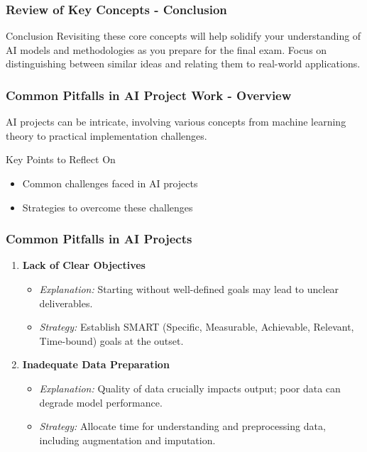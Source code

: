 \documentclass[aspectratio=169]{beamer}
\begin{document}
\begin{frame}[fragile]
    \frametitle{Review of Key Concepts - Conclusion}
    \begin{block}{Conclusion}
        Revisiting these core concepts will help solidify your understanding of AI models and methodologies as you prepare for the final exam. 
        Focus on distinguishing between similar ideas and relating them to real-world applications.
    \end{block}
\end{frame}

\begin{frame}[fragile]
    \frametitle{Common Pitfalls in AI Project Work - Overview}
    AI projects can be intricate, involving various concepts from machine learning theory to practical implementation challenges. 
    \begin{block}{Key Points to Reflect On}
        \begin{itemize}
            \item Common challenges faced in AI projects
            \item Strategies to overcome these challenges
        \end{itemize}
    \end{block}
\end{frame}

\begin{frame}[fragile]
    \frametitle{Common Pitfalls in AI Projects}
    \begin{enumerate}
        \item \textbf{Lack of Clear Objectives}
            \begin{itemize}
                \item \textit{Explanation:} Starting without well-defined goals may lead to unclear deliverables.
                \item \textit{Strategy:} Establish SMART (Specific, Measurable, Achievable, Relevant, Time-bound) goals at the outset.
            \end{itemize}
        \item \textbf{Inadequate Data Preparation}
            \begin{itemize}
                \item \textit{Explanation:} Quality of data crucially impacts output; poor data can degrade model performance.
                \item \textit{Strategy:} Allocate time for understanding and preprocessing data, including augmentation and imputation.
            \end{itemize}
    \end{enumerate}
\end{frame}
\end{document}
